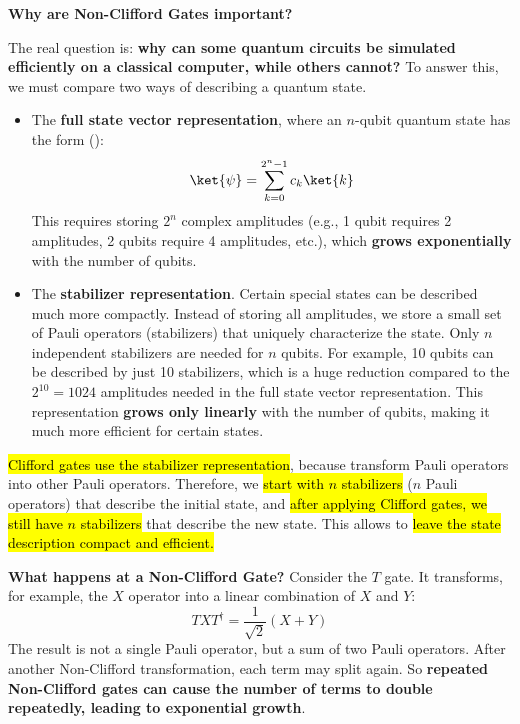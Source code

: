 \highspace
\begin{flushleft}
    \textcolor{Green3}{ \textbf{Why are Non-Clifford Gates important?}}\label{question:why-non-clifford-gates-important}
\end{flushleft}
The real question is: \textbf{why can some quantum circuits be simulated efficiently on a classical computer, while others cannot?} To answer this, we must compare two ways of describing a quantum state.
\begin{itemize}
    \item The \textbf{full state vector representation}, where an $n$-qubit quantum state has the form ():
    \begin{equation*}
        \ket{\psi} = \sum_{k=0}^{2^n-1} c_k \ket{k}
    \end{equation*}
    This requires storing $2^n$ complex amplitudes (e.g., 1 qubit requires 2 amplitudes, 2 qubits require 4 amplitudes, etc.), which \textbf{grows exponentially} with the number of qubits.

    \item The \textbf{stabilizer representation}. Certain special states can be described much more compactly. Instead of storing all amplitudes, we store a small set of Pauli operators (stabilizers) that uniquely characterize the state. Only $n$ independent stabilizers are needed for $n$ qubits. For example, 10 qubits can be described by just 10 stabilizers, which is a huge reduction compared to the $2^{10} = 1024$ amplitudes needed in the full state vector representation. This representation \textbf{grows only linearly} with the number of qubits, making it much more efficient for certain states.
\end{itemize}
\hl{Clifford gates use the stabilizer representation}, because transform Pauli operators into other Pauli operators. Therefore, we \hl{start with $n$ stabilizers} ($n$ Pauli operators) that describe the initial state, and \hl{after applying Clifford gates, we still have $n$ stabilizers} that describe the new state. This allows to \hl{leave the state description compact and efficient.}

\highspace
\textcolor{Green3}{ \textbf{What happens at a Non-Clifford Gate?}} Consider the $T$ gate. It transforms, for example, the $X$ operator into a linear combination of $X$ and $Y$:
\begin{equation*}
    T X T^\dagger =
    \frac{1}{\sqrt{2}} (X + Y)
\end{equation*}
The result is not a single Pauli operator, but a sum of two Pauli operators. After another Non-Clifford transformation, each term may split again. So \textbf{repeated Non-Clifford gates can cause the number of terms to double repeatedly, leading to exponential growth}.


